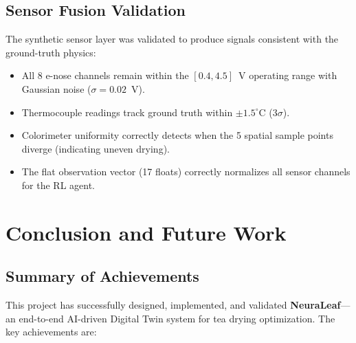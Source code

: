 ﻿\documentclass[12pt, a4paper]{report}
\begin{document}
\section{Sensor Fusion Validation}
The synthetic sensor layer was validated to produce signals consistent with the ground-truth physics:
\begin{itemize}
    \item All 8 e-nose channels remain within the $[0.4, 4.5]$~V operating range with Gaussian noise ($\sigma = 0.02$~V).
    \item Thermocouple readings track ground truth within $\pm 1.5^\circ$C (3$\sigma$).
    \item Colorimeter uniformity correctly detects when the 5 spatial sample points diverge (indicating uneven drying).
    \item The flat observation vector (17 floats) correctly normalizes all sensor channels for the RL agent.
\end{itemize}


\chapter{Conclusion and Future Work}

\section{Summary of Achievements}
This project has successfully designed, implemented, and validated \textbf{NeuraLeaf}---an end-to-end AI-driven Digital Twin system for tea drying optimization. The key achievements are:
\end{document}
